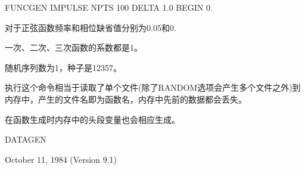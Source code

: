 FUNCGEN IMPULSE NPTS 100 DELTA 1.0 BEGIN 0.

对于正弦函数频率和相位缺省值分别为0.05和0.

一次、二次、三次函数的系数都是1。

随机序列数为1，种子是12357。

执行这个命令相当于读取了单个文件(除了RANDOM选项会产生多个文件之外)到内存中，产生的文件名即为函数名，内存中先前的数据都会丢失。

在函数生成时内存中的头段变量也会相应生成。

DATAGEN

October 11, 1984 (Version 9.1)
